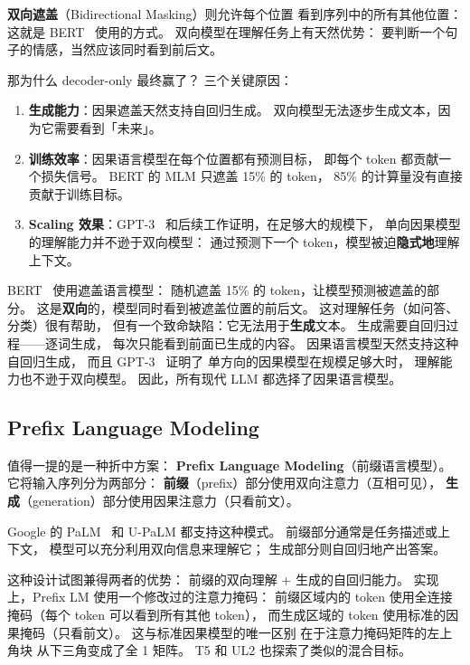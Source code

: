 \textbf{双向遮盖}（Bidirectional Masking）则允许每个位置
看到序列中的所有其他位置：
这就是 BERT~\cite{devlin2019bert} 使用的方式。
双向模型在理解任务上有天然优势：
要判断一个句子的情感，当然应该同时看到前后文。

那为什么 decoder-only 最终赢了？
三个关键原因：
\begin{enumerate}[noitemsep]
  \item \textbf{生成能力}：因果遮盖天然支持自回归生成。
        双向模型无法逐步生成文本，因为它需要看到「未来」。
  \item \textbf{训练效率}：因果语言模型在每个位置都有预测目标，
        即每个 token 都贡献一个损失信号。
        BERT 的 MLM 只遮盖 15\% 的 token，
        85\% 的计算量没有直接贡献于训练目标。
  \item \textbf{Scaling 效果}：GPT-3~\cite{brown2020gpt3}
        和后续工作证明，在足够大的规模下，
        单向因果模型的理解能力并不逊于双向模型：
        通过预测下一个 token，模型被迫\textbf{隐式地}理解上下文。
\end{enumerate}

\begin{whybox}
BERT~\cite{devlin2019bert} 使用遮盖语言模型：
随机遮盖 15\% 的 token，让模型预测被遮盖的部分。
这是\textbf{双向}的，模型同时看到被遮盖位置的前后文。
这对理解任务（如问答、分类）很有帮助，
但有一个致命缺陷：它无法用于\textbf{生成}文本。
生成需要自回归过程——逐词生成，
每次只能看到前面已生成的内容。
因果语言模型天然支持这种自回归生成，
而且 GPT-3~\cite{brown2020gpt3} 证明了
单方向的因果模型在规模足够大时，
理解能力也不逊于双向模型。
因此，所有现代 LLM 都选择了因果语言模型。
\end{whybox}

\subsection{Prefix Language Modeling}

值得一提的是一种折中方案：
\textbf{Prefix Language Modeling}（前缀语言模型）。
它将输入序列分为两部分：
\textbf{前缀}（prefix）部分使用双向注意力（互相可见），
\textbf{生成}（generation）部分使用因果注意力（只看前文）。

Google 的 PaLM~\cite{chowdhery2022palm} 和 U-PaLM 都支持这种模式。
前缀部分通常是任务描述或上下文，
模型可以充分利用双向信息来理解它；
生成部分则自回归地产出答案。

这种设计试图兼得两者的优势：
前缀的双向理解 + 生成的自回归能力。
实现上，Prefix LM 使用一个修改过的注意力掩码：
前缀区域内的 token 使用全连接掩码（每个 token 可以看到所有其他 token），
而生成区域的 token 使用标准的因果掩码（只看前文）。
这与标准因果模型的唯一区别
在于注意力掩码矩阵的左上角块
从下三角变成了全 1 矩阵。
T5 和 UL2 也探索了类似的混合目标。

